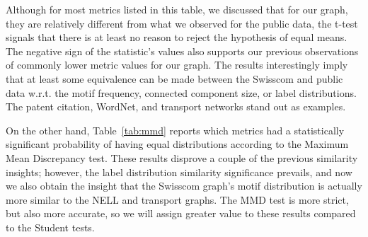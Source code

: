 Although for most metrics listed in this table, we discussed that for our graph, they are relatively different from what we observed for the public data, the t-test signals that there is at least no reason to reject the hypothesis of equal means. The negative sign of the statistic's values also supports our previous observations of commonly lower metric values for our graph. The results interestingly imply that at least some equivalence can be made between the Swisscom and public data w.r.t. the motif frequency, connected component size, or label distributions. The patent citation, WordNet, and transport networks stand out as examples.

On the other hand, Table~\ref{tab:mmd} reports which metrics had a statistically significant probability of having equal distributions according to the Maximum Mean Discrepancy test. These results disprove a couple of the previous similarity insights; however, the label distribution similarity significance prevails, and now we also obtain the insight that the Swisscom graph's motif distribution is actually more similar to the NELL and transport graphs. The MMD test is more strict, but also more accurate, so we will assign greater value to these results compared to the Student tests.

